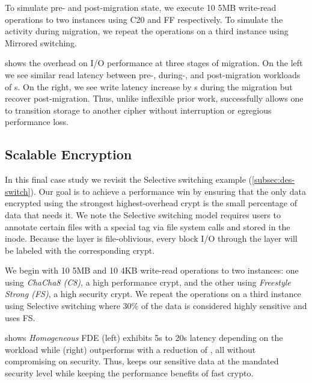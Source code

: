 To simulate pre- and post-migration state, we execute 10 5MB write-read
operations to two \sys instances using C20 and FF respectively. To simulate the
activity during migration, we repeat the operations on a third instance using
Mirrored switching.



 shows the overhead on I/O performance at three stages
of migration. On the left we see similar read latency between pre-, during-, and
post-migration workloads of s. On the right, we see write latency
increase by s during the migration but recover post-migration. Thus,
unlike inflexible prior work, \sys successfully allows one to transition storage
to another cipher without interruption or egregious performance loss.


\subsection{Scalable Encryption}\label{subsec:usecase-scalable}

In this final case study we revisit the Selective switching example
(\cref{subsec:des-switch}). Our goal is to achieve a performance win by ensuring
that the only data encrypted using the strongest highest-overhead crypt is the
small percentage of data that needs it. We note the Selective switching model
requires users to annotate certain files with a special tag via file system
calls and stored in the inode. Because the \sys layer is file-oblivious, every
block I/O through the \sys layer will be labeled with the corresponding crypt.

We begin with 10 5MB and 10 4KB write-read operations to two \sys instances: one
using {\em ChaCha8 (C8)}, a high performance crypt, and the other using {\em
Freestyle Strong (FS)}, a high security crypt. We repeat the operations on a
third instance using Selective switching where 30\% of the data is considered
highly sensitive and uses FS.



 shows {\em Homogeneous} FDE (left) exhibits 5s to
20s latency depending on the workload while \sys (right) outperforms with a
reduction of , all without compromising on security. Thus, \sys keeps our sensitive
data at the mandated security level while keeping the performance benefits of
fast crypto.
